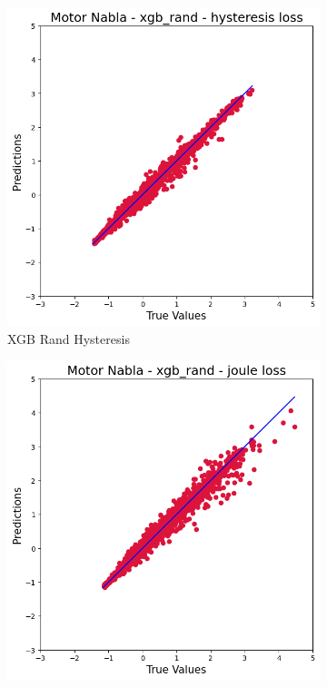 \documentclass{article}
\begin{document}
\begin{figure}[!htbp]
    \vspace{0.3cm}
    
    \begin{subfigure}[b]{0.23\textwidth}
        \centering
        \null
    \end{subfigure}
    \hfill
    \centering
    \begin{subfigure}[b]{0.23\textwidth}
        \centering
        \includegraphics[width=\textwidth]{images/Nabla/xgb_rand_hysteresis.png}
        \caption{XGB Rand Hysteresis}
    \end{subfigure}
    \hfill
    \begin{subfigure}[b]{0.23\textwidth}
        \centering
        \includegraphics[width=\textwidth]{images/Nabla/xgb_rand_joule.png}

\end{subfigure}
\end{figure}
\end{document}
